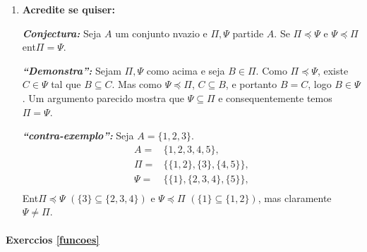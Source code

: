 \begin{enumerate}[{\bf 1.}]
\item {\bf Acredite se quiser:}  

\noindent \textit{\textbf{Conjectura:}} Seja $A$ um conjunto n\ao vazio e $\Pi,\Psi$ parti\coes de $A$. Se $\Pi\preceq\Psi$ e $\Psi\preceq\Pi$ ent\ao $\Pi=\Psi$.

\noindent \textit{\textbf{``Demonstra\caoi'':}} Sejam $\Pi,\Psi$ como acima e seja $B\in\Pi$. Como $\Pi\preceq\Psi$, existe $C\in\Psi $ tal que $B\subseteq C$. Mas como $\Psi\preceq\Pi$, $C\subseteq B$, e portanto $B=C$, logo $B\in\Psi$. Um argumento parecido mostra que $\Psi\subseteq\Pi$ e consequentemente temos $\Pi=\Psi$. 

\noindent \textit{\textbf{``contra-exemplo'':}} Seja $A=\{1,2,3\}$.
\begin{equation*}
 \begin{aligned}
A=&\{1,2,3,4,5\},\\
\Pi=&\{\{1,2\},\{3\},\{4,5\}\},\\
\Psi=&\{\{1\},\{2,3,4\},\{5\}\},\\
 \end{aligned}
\end{equation*}
Ent\ao $\Pi\preceq\Psi$ $(\{3\}\subseteq\{2,3,4\})$ e $\Psi\preceq\Pi$ $(\{1\}\subseteq\{1,2\})$, mas claramente $\Psi\neq\Pi$.
\end{enumerate}
\paragraph{Exerc\ih cios \ref{funcoes}}

